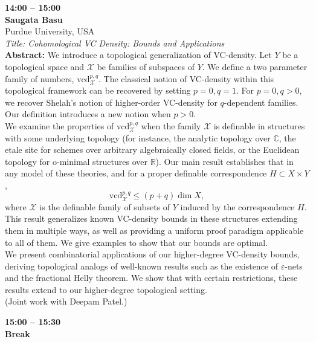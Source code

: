 \documentclass[10pt,a4paper]{article}
\begin{document}
\begin{tcolorbox}[talkbox]
\textbf{14:00 -- 15:00} \\
\textbf{Saugata Basu} \\
Purdue University, USA \\
\textit{Title: Cohomological VC Density: Bounds and Applications} \\
\textbf{Abstract:} We introduce a topological generalization of VC-density. Let $Y$ be a topological space and $\mathcal{X}$ be families of subspaces of $Y$. We define a two parameter family of numbers, $\mathrm{vcd}^{p,q}_{\mathcal{X}}$. The classical notion of VC-density within this topological framework can be recovered by setting  $p=0, q=1$. For $p=0, q > 0$, we recover Shelah’s notion of higher-order VC-density for $q$-dependent families. Our definition introduces a new notion when $p>0$.\\
				
We examine the properties of $\mathrm{vcd}^{p,q}_{\mathcal{X}}$ when the family $\mathcal{X}$ is definable in structures with some underlying topology (for instance, the analytic topology over $\mathbb{C}$, the etale site for schemes over arbitrary algebraically closed fields, or the Euclidean topology for o-minimal structures over $\mathbb{R}$). Our main result establishes that in any model of these theories, and for a proper definable correspondence $H \subset X \times Y$, $$\mathrm{vcd}^{p,q}_{\mathcal{X}} \leq (p+q) \dim X,$$ where $\mathcal{X}$ is the definable family of subsets of $Y$ induced by the correspondence $H$. This result generalizes known VC-density bounds in these structures extending them in multiple ways, as well as providing a uniform proof paradigm applicable to all of them. We give examples to show that our bounds are optimal. \\
							
We present combinatorial applications of our higher-degree VC-density bounds, deriving topological analogs of well-known results such as the existence of $\varepsilon$-nets and the fractional Helly theorem. We show that with certain restrictions, these results extend to our higher-degree topological setting. \\

(Joint work with Deepam Patel.)
\end{tcolorbox}

\begin{tcolorbox}[talkbox]
\textbf{15:00 -- 15:30} \\
\textbf{Break}
\end{tcolorbox}
\end{document}

